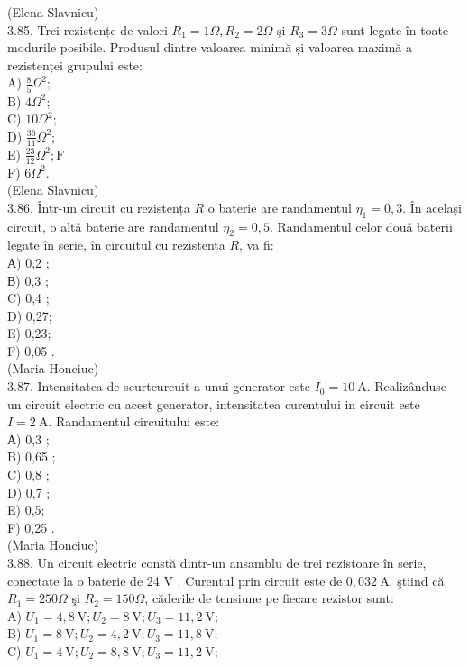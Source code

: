 \documentclass[10pt]{article}
\begin{document}
(Elena Slavnicu)\\
3.85. Trei rezistențe de valori $R_{1}=1 \Omega, R_{2}=2 \Omega$ şi $R_{3}=3 \Omega$ sunt legate în toate modurile posibile. Produsul dintre valoarea minimă și valoarea maximă a rezistenței grupului este:\\
A) $\frac{8}{5} \Omega^{2}$;\\
B) $4 \Omega^{2}$;\\
C) $10 \Omega^{2}$;\\
D) $\frac{36}{11} \Omega^{2}$;\\
E) $\frac{23}{12} \Omega^{2} ; \mathrm{F}$\\
F) $6 \Omega^{2}$.\\
(Elena Slavnicu)\\
3.86. Într-un circuit cu rezistența $R$ o baterie are randamentul $\eta_{1}=0,3$. În același circuit, o altă baterie are randamentul $\eta_{2}=0,5$. Randamentul celor două baterii legate în serie, în circuitul cu rezistența $R$, va fi:\\
А) 0,2 ;\\
В) 0,3 ;\\
C) 0,4 ;\\
D) 0,27;\\
E) 0,23;\\
F) 0,05 .\\
(Maria Honciuc)\\
3.87. Intensitatea de scurtcurcuit a unui generator este $I_{0}=10 \mathrm{~A}$. Realizânduse un circuit electric cu acest generator, intensitatea curentului in circuit este $I=2 \mathrm{~A}$. Randamentul circuitului este:\\
А) 0,3 ;\\
B) 0,65 ;\\
C) 0,8 ;\\
D) 0,7 ;\\
E) 0,5;\\
F) 0,25 .\\
(Maria Honciuc)\\
3.88. Un circuit electric constă dintr-un ansamblu de trei rezistoare în serie, conectate la o baterie de 24 V . Curentul prin circuit este de $0,032 \mathrm{~A}$. ştiind că $R_{1}=250 \Omega$ şi $R_{2}=150 \Omega$, căderile de tensiune pe fiecare rezistor sunt:\\
A) $U_{1}=4,8 \mathrm{~V} ; U_{2}=8 \mathrm{~V} ; U_{3}=11,2 \mathrm{~V}$;\\
B) $U_{1}=8 \mathrm{~V} ; U_{2}=4,2 \mathrm{~V} ; U_{3}=11,8 \mathrm{~V}$;\\
C) $U_{1}=4 \mathrm{~V} ; U_{2}=8,8 \mathrm{~V} ; U_{3}=11,2 \mathrm{~V}$;\\
\end{document}
